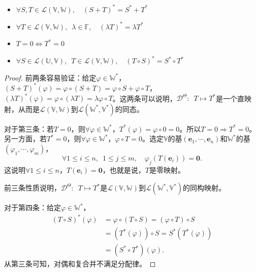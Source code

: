 \documentclass[12pt,UTF8,fontset=none]{ctexbook}
\begin{document}
\begin{pp}\label{pp:3_6}
    \begin{itemize}
        \item $\forall S, T \in \mathcal{L}(\mathbb{V}, \mathbb{W}), \quad (S + T)^* = S^* + T^*$
        \item $\forall T \in \mathcal{L}(\mathbb{V}, \mathbb{W}), \,\,\, \lambda \in \mathbb{F}, \quad (\lambda T)^* = \lambda T^*$
        \item $T=0 \Leftrightarrow T^* = 0$
        \item $\forall S \in \mathcal{L}(\mathbb{U}, \mathbb{V}), \,\,\, T \in \mathcal{L}(\mathbb{V}, \mathbb{W}), \quad (T \circ S)^* = S^* \circ T^*$
    \end{itemize}
\end{pp}
\begin{proof} %
前两条容易验证：给定$ \varphi \in \mathbb{W}^*$，$(S + T)^*(\varphi) = \varphi \circ (S + T) = \varphi \circ S + \varphi \circ T$，$(\lambda T)^*(\varphi) = \varphi \circ (\lambda T) = \lambda \varphi \circ T $。这两条可以说明，$\mathcal{D}^{\Theta}:\,\,\, T \mapsto T^*$是一个直映射，从而是$\mathcal{L}(\mathbb{V}, \mathbb{W})$到$\mathcal{L}(\mathbb{W}^*, \mathbb{V}^*)$的同态。

对于第三条：若$T = 0$，则$\forall \varphi \in \mathbb{W}^*$，$T^*(\varphi) = \varphi \circ 0 = 0$。所以$T=0 \Rightarrow T^* = 0$。另一方面，若$T^* = 0$，则$\forall \varphi \in \mathbb{W}^*$，$\varphi\circ T = 0$。选定$\mathbb{V}$的基$(\mathbf{e}_1, \cdots , \mathbf{e}_n)$和$\mathbb{W}^*$的基$(\varphi_1, \cdots , \varphi_m)$，
$$ \forall 1 \leqslant i \leqslant n, \,\,\,  1 \leqslant j \leqslant m, \quad \varphi_j (T(\mathbf{e}_i)) = \mathbf{0}.$$
这说明$\forall 1 \leqslant i \leqslant n$，$T(\mathbf{e}_i) = \mathbf{0}$，也就是说，$T$是零映射。

前三条性质说明，$\mathcal{D}^{\Theta}:\,\,\, T \mapsto T^*$是$\mathcal{L}(\mathbb{V}, \mathbb{W})$到$\mathcal{L}(\mathbb{W}^*, \mathbb{V}^*)$的同构映射。

对于第四条：给定$ \varphi \in \mathbb{W}^*$，
\begin{align*}
(T \circ S)^* (\varphi) &= \varphi \circ (T \circ S)  = (\varphi \circ T) \circ S  \\
&= (T^*(\varphi)) \circ S  = S^*(T^*(\varphi))  \\
&= (S^*\circ T^*)(\varphi). 
\end{align*}
从第三条可知，对偶和复合并不满足分配律。

\end{proof}
\end{document}
